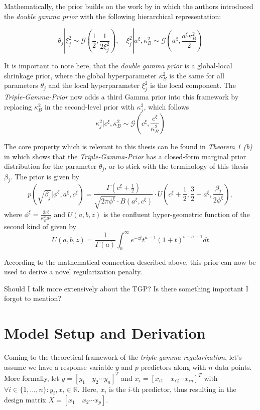 \documentclass[12pt,a4paper]{article}
\newenvironment{lightbluebox}{%
    \begin{tcolorbox}[colback=lightblue, colframe=lightblue, fontupper=\itshape]%
}{%
    \end{tcolorbox}%
}
\begin{document}
Mathematically, the prior builds on the work by \textcite{BittoFS2019} in which the authors introduced the \textit{double gamma prior} with the following hierarchical representation:

$$\theta_j|\xi^2_j \sim \mathcal{G}\left(\frac{1}{2}, \frac{1}{2\xi^2_j} \right), \quad \xi^2_j | a^\xi, \kappa^2_B \sim \mathcal{G}\left(a^\xi, \frac{a^\xi\kappa_B^2}{2}\right)$$

It is important to note here, that the \textit{double gamma prior} is a global-local shrinkage prior, where the global hyperparameter $\kappa^2_B$ is the same for all parameters $\theta_j$ and the local hyperparameter $\xi^2_j$ is the local component. The \textit{Triple-Gamma-Prior} now adds a third Gamma prior into this framework by replacing $\kappa_B^2$ in the second-level prior with $\kappa_j^2$, which follows
$$\kappa_j^2 | c^\xi, \kappa_B^2 \sim \mathcal{G}\left(c^\xi, \frac{c^\xi}{\kappa_B^2}\right)$$ 

The core property which is relevant to this thesis can be found in \textit{Theorem 1 (b)} in \textcite{TGP2020} which shows that the \textit{Triple-Gamma-Prior} has a closed-form marginal prior distribution for the parameter $\theta_j$, or to stick with the terminology of this thesis $\beta_j$. The prior is given by
$$p(\sqrt{\beta_j}|\phi^\xi, a^\xi, c^\xi) = \frac{\Gamma(c^\xi + \frac{1}{2})}{\sqrt{2\pi \phi^\xi}\cdot B(a^\xi, c^\xi)}\cdot U\left(c^\xi + \frac{1}{2}, \frac{3}{2}-a^\xi, \frac{\beta_j}{2\phi^\xi}\right),$$
where $\phi^\xi = \frac{2c^\xi}{\kappa^2_Ba^\xi}$ and $U(a,b,z)$ is the confluent hyper-geometric function of the second kind of \textcite{Tricomi1947} given by
$$U(a,b,z) = \frac{1}{\Gamma(a)}\int_0^\infty e^{-zt}t^{a-1}(1+t)^{b-a-1}dt$$

According to the mathematical connection described above, this prior can now be used to derive a novel regularization penalty.

\begin{lightbluebox}
Should I talk more extensively about the TGP? Is there something important I forgot to mention?
\end{lightbluebox}

\newpage
\section{Model Setup and Derivation}\label{sec:modelderivation}
Coming to the theoretical framework of the \textit{triple-gamma-regularization}, let's assume we have a response variable $y$ and $p$ predictors along with $n$ data points. More formally, let $y=[y_1  \quad y_2 \cdots y_n]^T$ and $x_i = [x_{i1} \quad x_{i2} \cdots x_{in}]^T$ with $\forall i\in \{1,...,n\}: y_i, x_i \in \mathbb{R}$. Here, $x_i$ is the $i$-th predictor, thus resulting in the design matrix $X = [x_1 \quad x_2 \cdots x_p]$.\\
\end{document}
